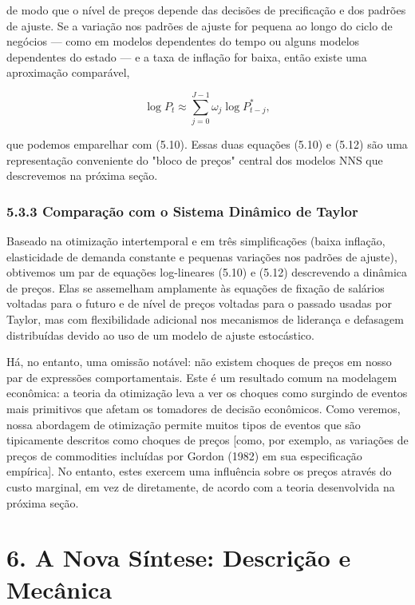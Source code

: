 \documentclass[12pt]{article}
\begin{document}
de modo que o nível de preços depende das decisões de precificação e dos padrões de ajuste. Se a variação nos padrões de ajuste for pequena ao longo do ciclo de negócios — como em modelos dependentes do tempo ou alguns modelos dependentes do estado — e a taxa de inflação for baixa, então existe uma aproximação comparável,

\begin{equation}
\log P_t \approx \sum_{j=0}^{J-1} \omega_j \log P_{t-j}^*, \tag{5.12}
\end{equation}

que podemos emparelhar com (5.10). Essas duas equações (5.10) e (5.12) são uma representação conveniente do "bloco de preços" central dos modelos NNS que descrevemos na próxima seção.

\subsubsection{5.3.3 Comparação com o Sistema Dinâmico de Taylor} Baseado na otimização intertemporal e em três simplificações (baixa inflação, elasticidade de demanda constante e pequenas variações nos padrões de ajuste), obtivemos um par de equações log-lineares (5.10) e (5.12) descrevendo a dinâmica de preços. Elas se assemelham amplamente às equações de fixação de salários voltadas para o futuro e de nível de preços voltadas para o passado usadas por Taylor, mas com flexibilidade adicional nos mecanismos de liderança e defasagem distribuídas devido ao uso de um modelo de ajuste estocástico.

Há, no entanto, uma omissão notável: não existem choques de preços em nosso par de expressões comportamentais. Este é um resultado comum na modelagem econômica: a teoria da otimização leva a ver os choques como surgindo de eventos mais primitivos que afetam os tomadores de decisão econômicos. Como veremos, nossa abordagem de otimização permite muitos tipos de eventos que são tipicamente descritos como choques de preços [como, por exemplo, as variações de preços de commodities incluídas por Gordon (1982) em sua especificação empírica]. No entanto, estes exercem uma influência sobre os preços através do custo marginal, em vez de diretamente, de acordo com a teoria desenvolvida na próxima seção.

\section{6. A Nova Síntese: Descrição e Mecânica}
\end{document}
